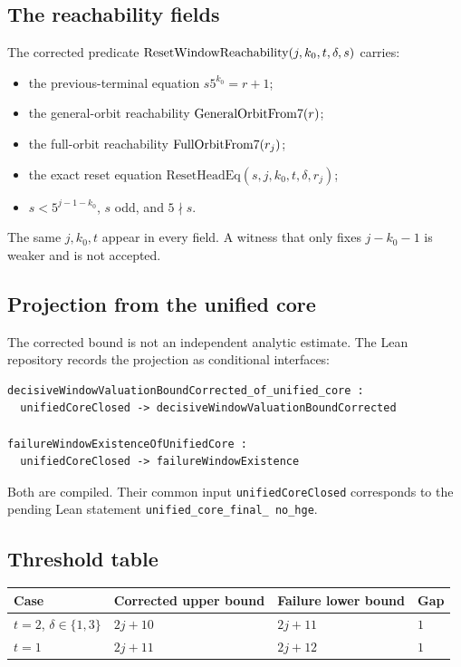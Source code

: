 \subsection{The reachability fields}

The corrected predicate $\mathrm{ResetWindowReachability}(j,k_0,t,\delta,s)$ carries:
\begin{itemize}[leftmargin=*]
\item the previous-terminal equation $s5^{k_0}=r+1$;
\item the general-orbit reachability $\mathrm{GeneralOrbitFrom7}(r)$;
\item the full-orbit reachability $\mathrm{FullOrbitFrom7}(r_j)$;
\item the exact reset equation
  $\mathrm{ResetHeadEq}(s,j,k_0,t,\delta,r_j)$;
\item $s<5^{j-1-k_0}$, $s$ odd, and $5\nmid s$.
\end{itemize}
The same $j,k_0,t$ appear in every field.  A witness that only fixes
$j-k_0-1$ is weaker and is not accepted.

\subsection{Projection from the unified core}

The corrected bound is not an independent analytic estimate.  The
Lean repository records the projection as conditional interfaces:
\begin{verbatim}
decisiveWindowValuationBoundCorrected_of_unified_core :
  unifiedCoreClosed -> decisiveWindowValuationBoundCorrected

failureWindowExistenceOfUnifiedCore :
  unifiedCoreClosed -> failureWindowExistence
\end{verbatim}
Both are compiled.  Their common input
\texttt{unifiedCoreClosed} corresponds to the pending Lean statement
\texttt{unified\_\allowbreak core\_\allowbreak final\_\allowbreak
no\_\allowbreak hge}.

\subsection{Threshold table}

\begin{center}
\small
\begin{tabular}{@{}llll@{}}
\toprule
Case & Corrected upper bound & Failure lower bound & Gap \\
\midrule
$t=2$, $\delta\in\{1,3\}$ & $2j+10$ & $2j+11$ & $1$ \\
$t=1$ & $2j+11$ & $2j+12$ & $1$ \\
\bottomrule
\end{tabular}
\end{center}

